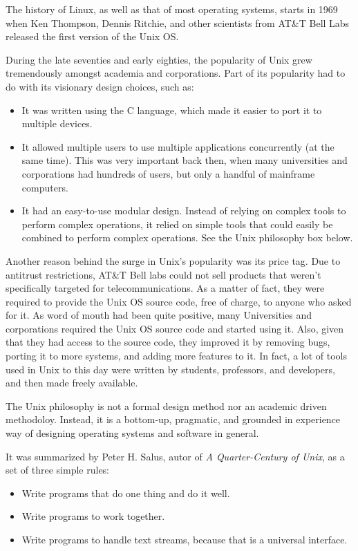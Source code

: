 The history of Linux, as well as that of most operating systems, starts in 1969 when Ken Thompson, Dennis Ritchie, and other scientists from AT\&T Bell Labs released the first version of the Unix \acs{OS}.

During the late seventies and early eighties, the popularity of Unix grew tremendously amongst academia and corporations. Part of its popularity had to do with its visionary design choices, such as:
\begin{itemize}
\item It was written using the C language, which made it easier to port it to multiple devices.
\item It allowed multiple users to use multiple applications concurrently (at the same time). This was very important back then, when many universities and corporations had hundreds of users, but only a handful of mainframe computers.
\item It had an easy-to-use modular design. Instead of relying on complex tools to perform complex operations, it relied on simple tools that could easily be combined to perform complex operations. See the Unix philosophy box below.
\end{itemize}
Another reason behind the surge in Unix's popularity was its price tag. Due to antitrust restrictions, AT\&T Bell labs could not sell products that weren't specifically targeted for telecommunications. As a matter of fact, they were required to provide the Unix \acs{OS} source code, free of charge, to anyone who asked for it. As word of mouth had been quite positive, many Universities and corporations required the Unix \acs{OS} source code and started using it. Also, given that they had access to the source code, they improved it by removing bugs, porting it to more systems, and adding more features to it. In fact, a lot of tools used in Unix to this day were written by students, professors, and developers, and then made freely available.

\vspace{0.5cm}
\begin{my_box}
The Unix philosophy is not a formal design method nor an academic driven methodoloy. Instead, it is a bottom-up, pragmatic, and grounded in experience way of designing operating systems and software in general.

It was summarized by Peter H. Salus, autor of \textit{A Quarter-Century of Unix}, as a set of three simple rules:
\begin{itemize}
\item Write programs that do one thing and do it well.
\item Write programs to work together.
\item Write programs to handle text streams, because that is a universal interface.
\end{itemize}
\label{box:philosophy}
\end{my_box}

